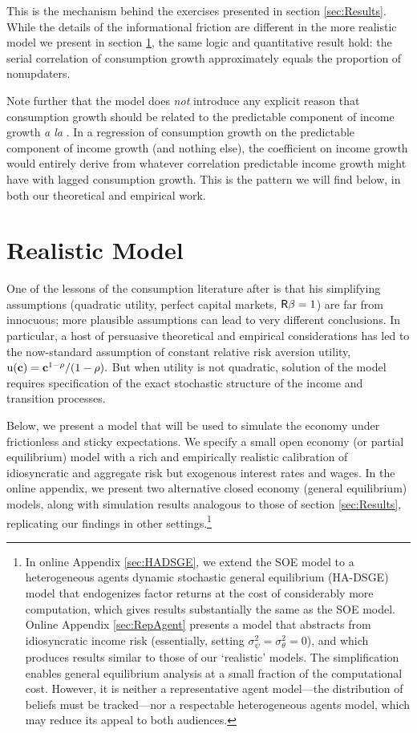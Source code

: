This is the mechanism behind the exercises presented in section \ref{sec:Results}.  While the details of the informational friction are different in the more realistic model we present in section \ref{sec:models}, the same logic and quantitative result hold: the serial correlation of consumption growth approximately equals the proportion of nonupdaters.

Note further that the model does {\it not} introduce any explicit reason that consumption growth should be related to the predictable component of income growth {\it a la} \cite{cmModel}.  In a regression of consumption growth on the predictable component of income growth (and nothing else), the coefficient on income growth would entirely derive from whatever correlation predictable income growth might have with lagged consumption growth.  This is the pattern we will find below, in both our theoretical and empirical work.



\section{Realistic Model}
\label{sec:models}

One of the lessons of the consumption literature after \cite{hallRandomWalk} is that his simplifying assumptions (quadratic utility, perfect capital markets, $\mathsf{R}\beta=1$) are far from innocuous; more plausible assumptions can lead to very different conclusions.  In particular, a host of persuasive theoretical and empirical considerations has led to the now-standard assumption of constant relative risk aversion utility, ${\mathrm{u}}(\mathbf{c})=\mathbf{c}^{1-\rho}/(1-\rho).$ But when utility is not quadratic, solution of the model requires specification of the exact stochastic structure of the income and transition processes.

Below, we present a model that will be used to simulate the economy under frictionless and sticky expectations.  We specify a small open economy (or partial equilibrium) model with a rich and empirically realistic calibration of idiosyncratic and aggregate risk but exogenous interest rates and wages. In the online appendix, we present two alternative closed economy (general equilibrium) models, along with simulation results analogous to those of section \ref{sec:Results}, replicating our findings in other settings.\footnote{In online Appendix \ref{sec:HADSGE}, we extend the SOE model to a heterogeneous agents dynamic stochastic general equilibrium (HA-DSGE) model that endogenizes factor returns at the cost of considerably more computation, which gives results substantially the same as the SOE model.  Online Appendix \ref{sec:RepAgent} presents a model that abstracts from idiosyncratic income risk (essentially, setting $\sigma^{2}_{\psi}=\sigma^{2}_{\theta}=0$), and which produces results similar to those of our `realistic' models.  The simplification enables general equilibrium analysis at a small fraction of the computational cost. However, it is neither a representative agent model---the distribution of beliefs must be tracked---nor a respectable heterogeneous agents model, which may reduce its appeal to both audiences.}

